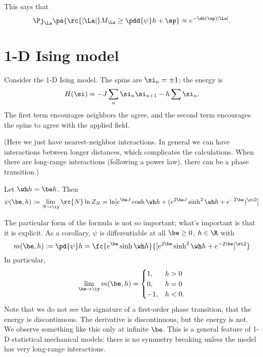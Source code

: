 This says that
\[
\Pj_{\La} \pa{\rc{|\La|}M_{\La} \ge \pdd{\psi}h + \ep} \approx e^{-\de(\ep)|\La|}.
\]

\section{1-D Ising model}
Consider the 1-D Ising model. The spins are $\si_n=\pm 1$; the energy is
\[
H(\si) = -J\sum_{n} \si_n\si_{n+1} - h\sum \si_n.
\]
The first term encourages neighbors the agree, and the second term encourages the spins to agree with the applied field.

(Here we just have nearest-neighbor interactions. In general we can have interactions between longer distances, which complicates the calculations. When there are long-range interactions (following a power law), there can be a phase transition.)
\begin{thm}
Let $\wh h = \be h$. Then
\[
\psi(\be, h):= \lim_{N\to \iy} \rc{N} \ln Z_N = \ln [e^{\be J} \cosh \wh h + (e^{2\be J} \sinh^2 \wh h + e^{-2\be})^{\rc 2}]
\]
\end{thm}
The particular form of the formula is not so important; what's important is that it is explicit. As a corollary, $\psi$ is differentiable at all $\be \ge 0$, $h\in \R$ with 
\[
m(\be, h):=\pd{\psi}h =  \fc{e^{\be}\sinh \wh h}{[e^{2\be }\sinh^2 \wh h + e^{-2\be}]^{\rc 2}}
\]
In particular, 
\[
\lim_{\be\to \iy} m(\be, h) = \begin{cases}
1,&h>0\\
0,&h=0\\
-1,&h<0.
\end{cases}
\]
Note that we do not see the signature of a first-order phase transition, that the energy is discontinuous. The derivative is discontinuous, but the energy is not. We observe something like this only at infinite $\be$. This is a general feature of 1-D statistical mechanical models: there is no symmetry breaking unless the model has very long-range interactions.



